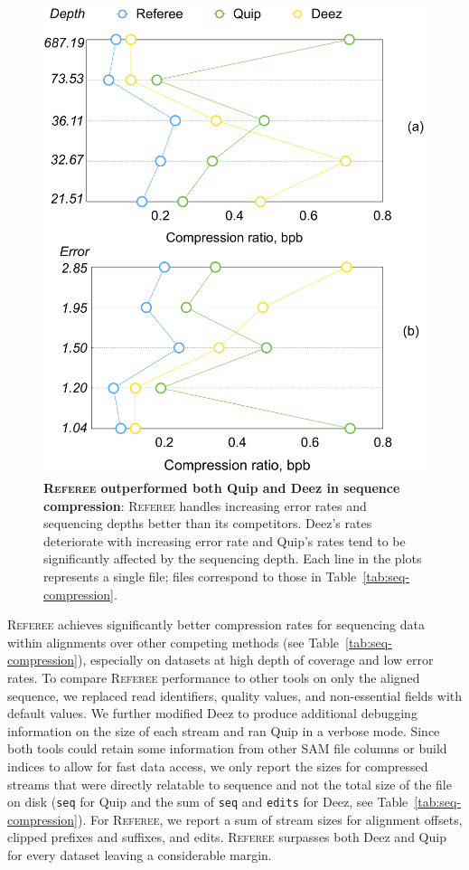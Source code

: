 \documentclass[12pt]{cmuthesis}
\newcommand{\refer}{\textsc{Referee}\xspace}
\begin{document}
  \begin{figure}[ht!]
    \centering
    \includegraphics[width=0.6\linewidth]{figures/referee_fig1_complete}
    \caption{\textbf{\refer outperformed both Quip and Deez in sequence compression}: \refer handles increasing error rates and sequencing depths better than its competitors. Deez's rates deteriorate with increasing error rate and Quip's rates tend to be significantly affected by the sequencing depth. Each line in the plots represents a single file; files correspond to those in Table~\ref{tab:seq-compression}.}
    \label{fig:referee:depth-error}
  \end{figure}

  \refer achieves significantly better compression rates for sequencing data within alignments over other competing methods (see Table~\ref{tab:seq-compression}), especially on datasets at high depth of coverage and low error rates. To compare \refer performance to other tools on only the aligned sequence, we replaced read identifiers, quality values, and non-essential fields with default values. We further modified Deez to produce additional debugging information on the size of each stream and ran Quip in a verbose mode. Since both tools could retain some information from other SAM file columns or build indices to allow for fast data access, we only report the sizes for compressed streams that were directly relatable to sequence and not the total size of the file on disk (\texttt{seq} for Quip and the sum of \texttt{seq} and \texttt{edits} for Deez, see Table~\ref{tab:seq-compression}). For \refer, we report a sum of stream sizes for alignment offsets, clipped prefixes and suffixes, and edits. \refer surpasses both Deez and Quip for every dataset leaving a considerable margin.
\end{document}
